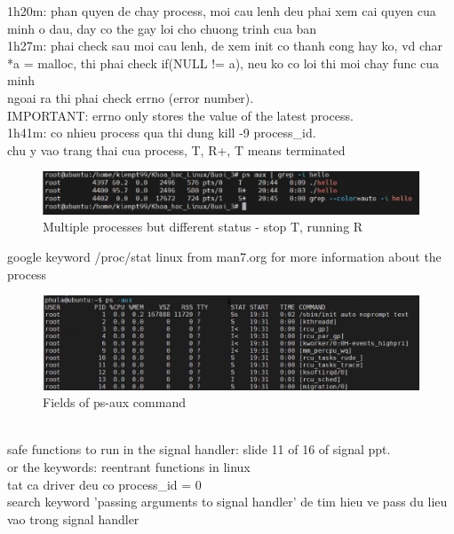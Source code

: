 \documentclass{article}
\begin{document}
1h20m: phan quyen de chay process, moi cau lenh deu phai xem cai quyen cua minh o dau, day co the gay loi cho chuong trinh cua ban
\\1h27m: phai check sau moi cau lenh, de xem init co thanh cong hay ko, vd char *a = malloc, thi phai check if(NULL != a), neu ko co loi thi moi chay func cua minh
\\ngoai ra thi phai check errno (error number).
\\IMPORTANT: errno only stores the value of the latest process.
\\1h41m: co nhieu process qua thi dung kill -9 process\_id.
\\chu y vao trang thai cua process, T, R+, T means terminated 
\begin{figure}[h]
  \includegraphics[scale=0.5]{emLinux_c03_multiple_processes}
  \caption{Multiple processes but different status - stop T, running R}  
\end{figure}

google keyword /proc/stat linux from man7.org for more information about the process
\begin{figure}[h]
  \includegraphics[scale=0.5]{emLinux_c03_fields-of_ps-aux_command}
  \caption{Fields of ps-aux command}  
\end{figure}
\\safe functions to run in the signal handler: slide 11 of 16 of signal ppt.
\\or the keywords: reentrant functions in linux
\\tat ca driver deu co process\_id = 0
\\search keyword 'passing arguments to signal handler' de tim hieu ve pass du lieu vao trong signal handler
\end{document}
